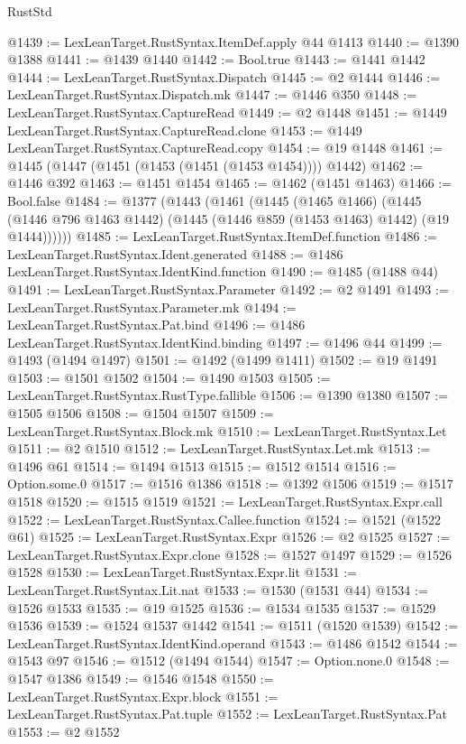 \begin{lexlean}{RustStd}
\begin{coremodule}
{\begin{coremodule}
{{{{{{{{{{{{{{{{{{{{{{{{{{{{{{{{{{{@1439 := LexLeanTarget.RustSyntax.ItemDef.apply @44 @1413
@1440 := @1390 @1388
@1441 := @1439 @1440
@1442 := Bool.true
@1443 := @1441 @1442
@1444 := LexLeanTarget.RustSyntax.Dispatch
@1445 := @2 @1444
@1446 := LexLeanTarget.RustSyntax.Dispatch.mk
@1447 := @1446 @350
@1448 := LexLeanTarget.RustSyntax.CaptureRead
@1449 := @2 @1448
@1451 := @1449 LexLeanTarget.RustSyntax.CaptureRead.clone
@1453 := @1449 LexLeanTarget.RustSyntax.CaptureRead.copy
@1454 := @19 @1448
@1461 := @1445 (@1447 (@1451 (@1453 (@1451 (@1453 @1454)))) @1442)
@1462 := @1446 @392
@1463 := @1451 @1454
@1465 := @1462 (@1451 @1463)
@1466 := Bool.false
@1484 := @1377
    (@1443
      (@1461
        (@1445
          (@1465 @1466)
          (@1445 (@1446 @796 @1463 @1442) (@1445 (@1446 @859 (@1453 @1463) @1442) (@19 @1444))))))
@1485 := LexLeanTarget.RustSyntax.ItemDef.function
@1486 := LexLeanTarget.RustSyntax.Ident.generated
@1488 := @1486 LexLeanTarget.RustSyntax.IdentKind.function
@1490 := @1485 (@1488 @44)
@1491 := LexLeanTarget.RustSyntax.Parameter
@1492 := @2 @1491
@1493 := LexLeanTarget.RustSyntax.Parameter.mk
@1494 := LexLeanTarget.RustSyntax.Pat.bind
@1496 := @1486 LexLeanTarget.RustSyntax.IdentKind.binding
@1497 := @1496 @44
@1499 := @1493 (@1494 @1497)
@1501 := @1492 (@1499 @1411)
@1502 := @19 @1491
@1503 := @1501 @1502
@1504 := @1490 @1503
@1505 := LexLeanTarget.RustSyntax.RustType.fallible
@1506 := @1390 @1380
@1507 := @1505 @1506
@1508 := @1504 @1507
@1509 := LexLeanTarget.RustSyntax.Block.mk
@1510 := LexLeanTarget.RustSyntax.Let
@1511 := @2 @1510
@1512 := LexLeanTarget.RustSyntax.Let.mk
@1513 := @1496 @61
@1514 := @1494 @1513
@1515 := @1512 @1514
@1516 := Option.some.{0}
@1517 := @1516 @1386
@1518 := @1392 @1506
@1519 := @1517 @1518
@1520 := @1515 @1519
@1521 := LexLeanTarget.RustSyntax.Expr.call
@1522 := LexLeanTarget.RustSyntax.Callee.function
@1524 := @1521 (@1522 @61)
@1525 := LexLeanTarget.RustSyntax.Expr
@1526 := @2 @1525
@1527 := LexLeanTarget.RustSyntax.Expr.clone
@1528 := @1527 @1497
@1529 := @1526 @1528
@1530 := LexLeanTarget.RustSyntax.Expr.lit
@1531 := LexLeanTarget.RustSyntax.Lit.nat
@1533 := @1530 (@1531 @44)
@1534 := @1526 @1533
@1535 := @19 @1525
@1536 := @1534 @1535
@1537 := @1529 @1536
@1539 := @1524 @1537 @1442
@1541 := @1511 (@1520 @1539)
@1542 := LexLeanTarget.RustSyntax.IdentKind.operand
@1543 := @1486 @1542
@1544 := @1543 @97
@1546 := @1512 (@1494 @1544)
@1547 := Option.none.{0}
@1548 := @1547 @1386
@1549 := @1546 @1548
@1550 := LexLeanTarget.RustSyntax.Expr.block
@1551 := LexLeanTarget.RustSyntax.Pat.tuple
@1552 := LexLeanTarget.RustSyntax.Pat
@1553 := @2 @1552
}}}}}}}}}}}}}}}}}}}}}}}}}}}}}}}}}}}
\end{coremodule}}
\end{coremodule}
\end{lexlean}
